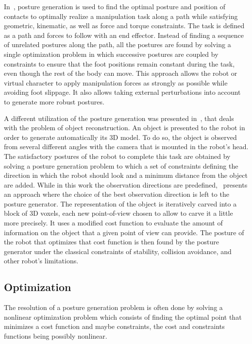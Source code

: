 In~\cite{liu:acm:2012}, posture generation is used to find the optimal posture and position of contacts to optimally realize a manipulation task along a path while satisfying geometric, kinematic, as well as force and torque constraints.
The task is defined as a path and forces to follow with an end effector.
Instead of finding a sequence of unrelated postures along the path, all the postures are found by solving a single optimization problem in which successive postures are coupled by constraints to ensure that the foot positions remain constant during the task, even though the rest of the body can move.
This approach allows the robot or virtual character to apply manipulation forces as strongly as possible while avoiding foot slippage.
It also allows taking external perturbations into account to generate more robust postures.

A different utilization of the posture generation was presented in~\cite{stasse:humanoids:2007}, that deals with the problem of object reconstruction.
An object is presented to the robot in order to generate automatically its 3D model.
To do so, the object is observed from several different angles with the camera that is mounted in the robot's head.
The satisfactory postures of the robot to complete this task are obtained by solving a posture generation problem to which a set of constraints defining the direction in which the robot should look and a minimum distance from the object are added.
While in this work the observation directions are predefined,~\cite{foissotte:humanoids:2008} presents an approach where the choice of the best observation direction is left to the posture generator.
The representation of the object is iteratively carved into a block of 3D voxels, each new point-of-view chosen to allow to carve it a little more precisely.
It uses a modified cost function to evaluate the amount of information on the object that a given point of view can provide.
The posture of the robot that optimizes that cost function is then found by the posture generator under the classical constraints of stability, collision avoidance, and other robot's limitations.


\subsection{Optimization}
\label{sub:optimization}

The resolution of a posture generation problem is often done by solving a nonlinear optimization problem which consists of finding the optimal point that minimizes a cost function and maybe constraints, the cost and constraints functions being possibly nonlinear.

